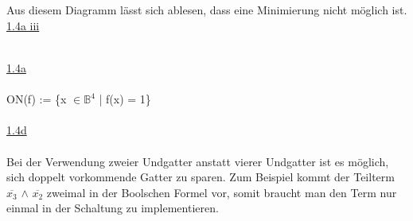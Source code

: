 \documentclass[a4paper,10pt]{scrartcl}
\begin{document}
\\\\
Aus diesem Diagramm lässt sich ablesen, dass eine Minimierung nicht möglich ist.
\newpage
\noindent
\underline{1.4a iii}\\\\
\underline{1.4a}\\\\
ON(f) := \{x $\in\mathbb{B}^4$ | f(x) = 1\}\\\\
\underline{1.4d}\\\\
Bei der Verwendung zweier Undgatter anstatt vierer Undgatter ist es möglich, sich doppelt vorkommende Gatter zu sparen. Zum Beispiel kommt der Teilterm $\overline{x_{3}}$ $\land$ $\overline{x_{2}}$ zweimal in der Boolschen Formel vor, somit braucht man den Term nur einmal in der Schaltung zu implementieren.\\\\
\end{document}
